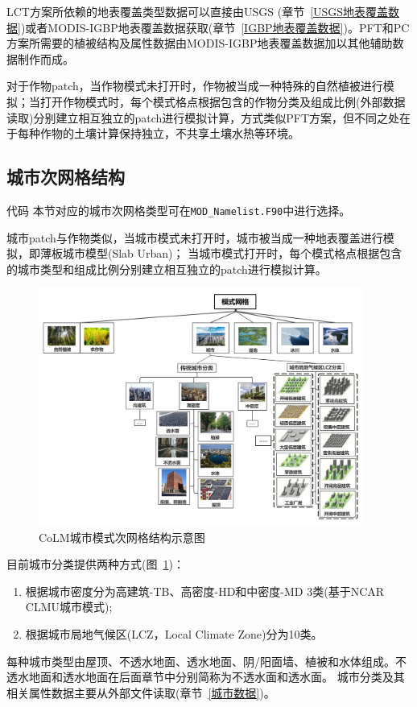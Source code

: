 LCT方案所依赖的地表覆盖类型数据可以直接由USGS (章节~\ref{USGS地表覆盖数据})或者MODIS-IGBP地表覆盖数据获取(章节~\ref{IGBP地表覆盖数据})。PFT和PC方案所需要的植被结构及属性数据由MODIS-IGBP地表覆盖数据加以其他辅助数据制作而成。

对于作物patch，当作物模式未打开时，作物被当成一种特殊的自然植被进行模拟；当打开作物模式时，每个模式格点根据包含的作物分类及组成比例(外部数据读取)分别建立相互独立的patch进行模拟计算，方式类似PFT方案，但不同之处在于每种作物的土壤计算保持独立，不共享土壤水热等环境。

\subsection{城市次网格结构}
\begin{mymdframed}{代码}
  本节对应的城市次网格类型可在\texttt{MOD\_Namelist.F90}中进行选择。
\end{mymdframed}

城市patch与作物类似，当城市模式未打开时，城市被当成一种地表覆盖进行模拟，即薄板城市模型(Slab Urban)；
当城市模式打开时，每个模式格点根据包含的城市类型和组成比例分别建立相互独立的patch进行模拟计算。

{
  \begin{figure}[htbp]
    \centering
    \includegraphics[width=0.95\textwidth]{Figures/模式构架/CoLM城市次网格示意图.jpg}
    \caption[CoLM城市模式次网格结构示意图]{CoLM城市模式次网格结构示意图}
    \label{fig:城市次网格}
  \end{figure}
}

目前城市分类提供两种方式(图~\ref{fig:城市次网格})：
\begin{enumerate}
  \item 根据城市密度分为高建筑-TB、高密度-HD和中密度-MD 3类(基于NCAR CLMU城市模式);
  \item 根据城市局地气候区(LCZ，Local Climate Zone)分为10类。
\end{enumerate}
每种城市类型由屋顶、不透水地面、透水地面、阴/阳面墙、植被和水体组成。不透水地面和透水地面在后面章节中分别简称为不透水面和透水面。
城市分类及其相关属性数据主要从外部文件读取(章节~\ref{城市数据})。

